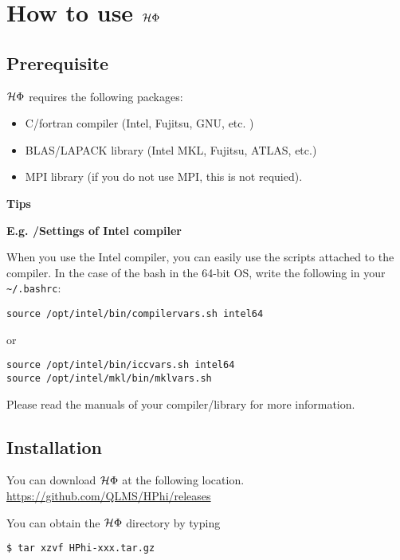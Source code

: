 \chapter{How to use $\mathcal{H} \Phi$}
\label{Ch:HowTo}

\section{Prerequisite}

$\mathcal{H} \Phi$ requires the following packages:
\begin{itemize}
\item C/fortran compiler (Intel, Fujitsu, GNU, etc. )
\item BLAS/LAPACK library (Intel MKL, Fujitsu, ATLAS, etc.)
\item MPI library (if you do not use MPI, this is not requied).
\end{itemize}

\begin{screen}
\Large 
{\bf Tips}
\normalsize

{\bf E.g. /Settings of Intel compiler}

When you use the Intel compiler, you can easily use the scripts attached to the compiler.
In the case of the bash in the 64-bit OS, write the following in your \verb|~/.bashrc|:
\begin{verbatim}
source /opt/intel/bin/compilervars.sh intel64
\end{verbatim}
or
\begin{verbatim}
source /opt/intel/bin/iccvars.sh intel64
source /opt/intel/mkl/bin/mklvars.sh
\end{verbatim}

Please read the manuals of your compiler/library for more information.

\end{screen}

\section{Installation}

You can download $\mathcal{H} \Phi$ at the following location.\\
\url{https://github.com/QLMS/HPhi/releases}

You can obtain the $\mathcal{H} \Phi$ directory by typing
\begin{verbatim}
$ tar xzvf HPhi-xxx.tar.gz
\end{verbatim}

